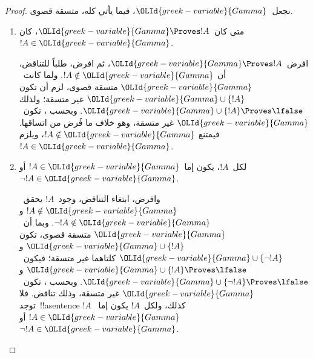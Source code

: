 \documentclass[../../../include/open-logic-section]{subfiles}
\begin{document}
\begin{proof}
نجعل~${\OLId{greek-variable}{Gamma}}$، فيما يأتي كله، متسقة قصوى.
\begin{enumerate}
\item متى كان~${\OLId{greek-variable}{Gamma}} \Proves !A$، كان~$!A \in {\OLId{greek-variable}{Gamma}}$.

افرض~${\OLId{greek-variable}{Gamma}} \Proves !A$، ثم افرض، طلباً للتناقض، أن
$!A \notin {\OLId{greek-variable}{Gamma}}$. ولما كانت~${\OLId{greek-variable}{Gamma}}$ متسقة قصوى، لزم أن تكون
${\OLId{greek-variable}{Gamma}} \cup \{!A\}$ غير متسقة؛ ولذلك
${\OLId{greek-variable}{Gamma}} \cup \{!A\} \Proves \lfalse$. وبحسب
،
تكون~${\OLId{greek-variable}{Gamma}}$ غير متسقة، وهو خلاف ما فُرض من اتساقها. فيمتنع
$!A \notin {\OLId{greek-variable}{Gamma}}$، ويلزم~$!A \in {\OLId{greek-variable}{Gamma}}$.

\item لكل~$!A$، يكون إما~$!A \in {\OLId{greek-variable}{Gamma}}$ أو~$\lnot !A \in {\OLId{greek-variable}{Gamma}}$.

وافرض، ابتغاء التناقض، وجود~$!A$ يحقق~$!A \notin {\OLId{greek-variable}{Gamma}}$ و
$\lnot !A \notin {\OLId{greek-variable}{Gamma}}$. وبما أن~${\OLId{greek-variable}{Gamma}}$ متسقة قصوى، تكون
${\OLId{greek-variable}{Gamma}} \cup \{!A\}$ و${\OLId{greek-variable}{Gamma}} \cup \{\lnot !A\}$ كلتاهما غير
متسقة؛ فيكون~${\OLId{greek-variable}{Gamma}} \cup \{!A\} \Proves \lfalse$ و
${\OLId{greek-variable}{Gamma}} \cup \{\lnot !A\} \Proves \lfalse$. وبحسب
،
تكون~${\OLId{greek-variable}{Gamma}}$ غير متسقة، وذلك تناقض. فلا توجد~!!a{sentence}
$!A$ كذلك، ولكل~$!A$ يكون إما~$!A \in {\OLId{greek-variable}{Gamma}}$ أو
$\lnot !A \in {\OLId{greek-variable}{Gamma}}$.

\end{enumerate}
\end{proof}
\end{document}
